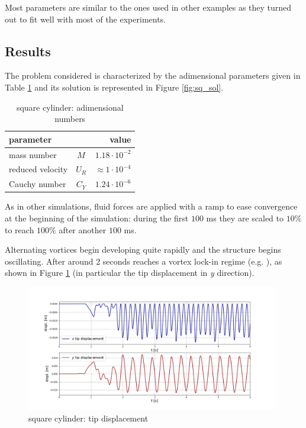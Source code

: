 Most parameters are similar to the ones used in other examples as they turned out to fit well with most of the experiments. 

\subsection{Results}

The problem considered is characterized by the adimensional parameters given in Table \ref{table:sq-adim} and its solution is represented in Figure \ref{fig:sq_sol}.

\begin{table}[!htb]
	\begin{center}
		\begin{tabular}{ l c | r } 
			parameter & & value   \\ 
			\hline
			mass number  & $M$ & $ 1.18\cdot 10^{-2}$     \\
			reduced velocity & $U_R$ & $ \approx 1\cdot 10^{-4}$  \\
			Cauchy number  & $C_Y$ & $  1.24 \cdot 10^{-6}$  \\			
		\end{tabular}
	\end{center}
	\caption{square cylinder: adimensional numbers}
	\label{table:sq-adim}
\end{table}

As in other simulations, fluid forces are applied with a ramp to ease convergence at the beginning of the simulation: during the first $100$ \si{ms} they are scaled to $10\%$ to reach $100\%$ after another $100$ \si{ms}.

Alternating vortices begin developing quite rapidly and the structure begins oscillating. After around 2 seconds reaches a vortex lock-in regime (e.g. \cite{hong2001fluid}), as shown in Figure \ref{fig:sq_displacement} (in particular the tip displacement in \textit{y} direction).


\begin{figure}[htbp!]
	\centering
	\includegraphics[width=0.98\textwidth, trim=20 20 20 50, clip]{images/sq-cyl/disp_sq.png}
	\caption{square cylinder: tip displacement}
	\label{fig:sq_displacement}
\end{figure}

